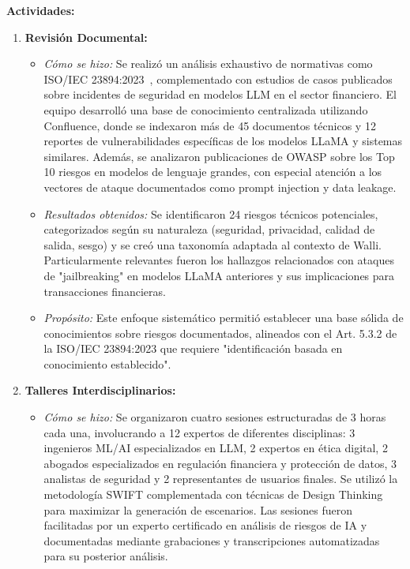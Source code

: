 \documentclass[12pt]{article}
\begin{document}
\textbf{Actividades:}
\begin{enumerate}
    \item \textbf{Revisión Documental:}
        \begin{itemize}
            \item \textit{Cómo se hizo:} Se realizó un análisis exhaustivo de normativas como ISO/IEC 23894:2023~\cite{iso23894}, complementado con estudios de casos publicados sobre incidentes de seguridad en modelos LLM en el sector financiero. El equipo desarrolló una base de conocimiento centralizada utilizando Confluence, donde se indexaron más de 45 documentos técnicos y 12 reportes de vulnerabilidades específicas de los modelos LLaMA y sistemas similares. Además, se analizaron publicaciones de OWASP sobre los Top 10 riesgos en modelos de lenguaje grandes, con especial atención a los vectores de ataque documentados como prompt injection y data leakage.
            \item \textit{Resultados obtenidos:} Se identificaron 24 riesgos técnicos potenciales, categorizados según su naturaleza (seguridad, privacidad, calidad de salida, sesgo) y se creó una taxonomía adaptada al contexto de Walli. Particularmente relevantes fueron los hallazgos relacionados con ataques de "jailbreaking" en modelos LLaMA anteriores y sus implicaciones para transacciones financieras.
            \item \textit{Propósito:} Este enfoque sistemático permitió establecer una base sólida de conocimientos sobre riesgos documentados, alineados con el Art. 5.3.2 de la ISO/IEC 23894:2023 que requiere "identificación basada en conocimiento establecido".
        \end{itemize}
    \item \textbf{Talleres Interdisciplinarios:}
        \begin{itemize}
            \item \textit{Cómo se hizo:} Se organizaron cuatro sesiones estructuradas de 3 horas cada una, involucrando a 12 expertos de diferentes disciplinas: 3 ingenieros ML/AI especializados en LLM, 2 expertos en ética digital, 2 abogados especializados en regulación financiera y protección de datos, 3 analistas de seguridad y 2 representantes de usuarios finales. Se utilizó la metodología SWIFT complementada con técnicas de Design Thinking para maximizar la generación de escenarios. Las sesiones fueron facilitadas por un experto certificado en análisis de riesgos de IA y documentadas mediante grabaciones y transcripciones automatizadas para su posterior análisis.

\end{itemize}
\end{enumerate}
\end{document}
